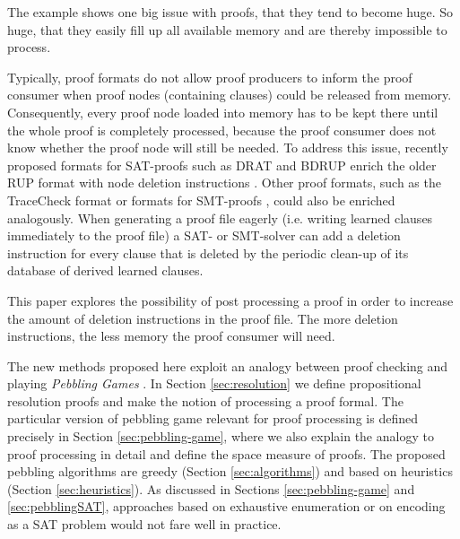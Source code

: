 The example shows one big issue with proofs, that they tend to become huge.
So huge, that they easily fill up all available memory and are thereby impossible to process.

Typically, proof formats do not allow proof producers to inform the proof consumer when proof nodes (containing clauses) could be released from memory. Consequently, every proof node loaded into memory has to be kept there until the whole proof is completely processed, because the proof consumer does not know whether the proof node will still be needed. To address this issue, recently proposed formats for SAT-proofs such as DRAT and BDRUP enrich the older RUP format with node deletion instructions \cite{raey}. Other proof formats, such as the TraceCheck format \cite{BiereHeuleAPPA} or formats for SMT-proofs \cite{BarrettFontaineMouraAPPA}, could also be enriched analogously. When generating a proof file eagerly (i.e. writing learned clauses immediately to the proof file) a SAT- or SMT-solver can add a deletion instruction for every clause that is deleted by the periodic clean-up of its database of derived learned clauses.

This paper explores the possibility of post processing a proof in order to increase the amount of deletion instructions in the proof file. 
The more deletion instructions, the less memory the proof consumer will need.


The new methods proposed here exploit an analogy between proof checking and playing \emph{Pebbling Games} \cite{Kasai1979,Gilbert1980}.
In Section \ref{sec:resolution} we define propositional resolution proofs and make the notion of processing a proof formal.
The particular version of pebbling game relevant for proof processing is defined precisely in Section \ref{sec:pebbling-game}, where we also explain the analogy to proof processing in detail and define the space measure of proofs. The proposed pebbling algorithms are greedy (Section \ref{sec:algorithms}) and based on heuristics (Section \ref{sec:heuristics}). As discussed in Sections \ref{sec:pebbling-game} and \ref{sec:pebblingSAT}, approaches based on exhaustive enumeration or on encoding as a SAT problem would not fare well in practice.

